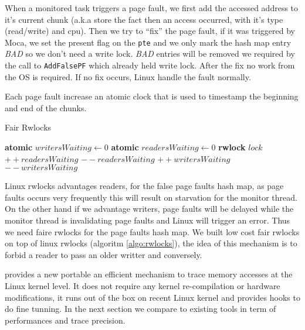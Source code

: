 When a monitored task triggers a page fault, we first add the
accessed address to it's current chunk (a.k.a store the fact
then an access occurred, with it's type (read/write) and cpu).
Then we try to ``fix'' the page fault, if it was triggered by
Moca, we set the present flag on the \texttt{pte} and we only mark the hash
map entry \emph{BAD} so we don't need a write lock. \emph{BAD} entries will be
removed we required by the call to \texttt{AddFalsePF} which already held
write lock. After the fix no work from the OS is required. If no fix occurs,
Linux handle the fault normally.

Each page fault increase an atomic clock that is used to timestamp the
beginning and end of the chunks.

\begin{algorithm}[!htb]
    \caption{Fair Rwlocks}
    \label{algo:rwlocks}
    \begin{algorithmic}[1]
    \State \textbf{atomic} {$writersWaiting \gets 0$}
    \State \textbf{atomic} $readersWaiting \gets 0$
    \State \textbf{rwlock} $lock$
        \State $++readersWaiting$
            \State {}
        \EndWhile
        \State {}
        \State $--readersWaiting$
    \EndFunction
        \State {}
    \EndFunction
            \State {}
        \EndWhile
        \State $++writersWaiting$
        \State {}
        \State $--writersWaiting$
    \EndFunction
        \State {}
    \EndFunction
    \end{algorithmic}
\end{algorithm}

Linux rwlocks advantages readers, for the false page faults hash map, as page
faults occurs very frequently this will result on starvation for the monitor
thread. On the other hand if we advantage writers, page faults will be delayed
while the monitor thread is invalidating page faults and Linux will trigger an
error. Thus we need faire rwlocks for the page faults hash map. We built
low cost fair rwlocks on top of linux rwlocks (algoritm \ref{algo:rwlocks}),
the idea of this mechanism is to forbid a reader to pass an older writter and
conversely.

\Moca provides a new portable an efficient mechanism to trace memory accesses
at the Linux kernel level. It does not require any kernel re-compilation or
hardware modifications, it runs out of the box on recent Linux kernel and
provides hooks to do fine tunning. In the next section we compare \Moca to
existing tools in term of performances and trace precision.
